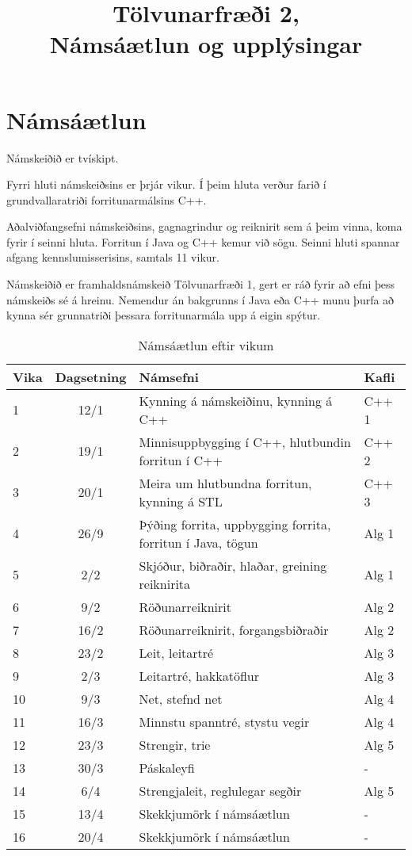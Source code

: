 \documentclass{article}
\title{Tölvunarfræði 2, \semester \\ Námsáætlun og upplýsingar}
\author{}
\begin{document}
\maketitle
{}

\section{Námsáætlun}
\label{sec:schedule}

Námskeiðið er tvískipt. 

Fyrri hluti námskeiðsins er þrjár vikur. Í þeim hluta verður farið í grundvallaratriði forritunarmálsins C++.

Aðalviðfangsefni námskeiðsins, gagnagrindur og reiknirit sem á þeim vinna, koma fyrir í seinni hluta. Forritun í Java og C++ kemur við sögu. Seinni hluti spannar afgang kennslumisserisins, samtals 11 vikur.

Námskeiðið er framhaldsnámskeið Tölvunarfræði 1, gert er ráð fyrir að efni þess námskeiðs sé á hreinu. Nemendur án bakgrunns í Java eða C++ munu þurfa að kynna sér grunnatriði þessara forritunarmála upp á eigin spýtur.

\begin{table}
\caption{Námsáætlun eftir vikum}
\label{tab:schedule}
\begin{center}
\renewcommand{\arraystretch}{1.2}
\begin{tabularx}{\linewidth}{lcXp{1cm}}
\toprule
Vika&Dagsetning&Námsefni&Kafli\\
\midrule
1	&12/1	& Kynning á námskeiðinu, kynning á C++ &C++ 1\\
2	&19/1	& Minnisuppbygging í C++, hlutbundin forritun í C++&C++ 2\\
3	&20/1	& Meira um hlutbundna forritun, kynning á STL&C++ 3\\
4	&26/9	& Þýðing forrita, uppbygging forrita, forritun í Java, tögun&Alg 1\\
5	&2/2	& Skjóður, biðraðir, hlaðar, greining reiknirita&Alg 1\\
6	&9/2	& Röðunarreiknirit&Alg 2\\
7	&16/2	& Röðunarreiknirit, forgangsbiðraðir&Alg 2\\
8	&23/2	& Leit, leitartré&Alg 3\\
9	&2/3	& Leitartré, hakkatöflur&Alg 3\\
10	&9/3	& Net, stefnd net&Alg 4\\
11	&16/3	& Minnstu spanntré, stystu vegir&Alg 4\\
12	&23/3	& Strengir, trie&Alg 5\\
13	&30/3	& Páskaleyfi&-\\
14	&6/4	& Strengjaleit, reglulegar segðir&Alg 5\\
15	&13/4	& Skekkjumörk í námsáætlun&-\\
16	&20/4	& Skekkjumörk í námsáætlun&-\\
\bottomrule
\end{tabularx}
\end{center}
\end{table}
\end{document}
